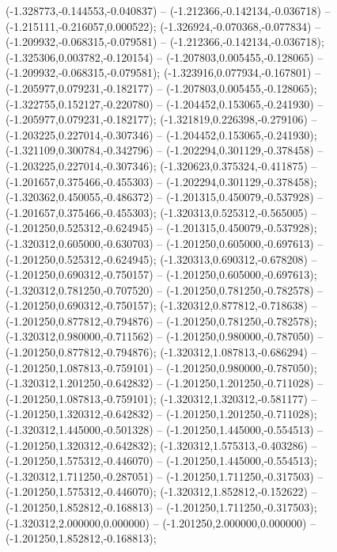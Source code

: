  (-1.328773,-0.144553,-0.040837) -- (-1.212366,-0.142134,-0.036718) -- (-1.215111,-0.216057,0.000522);
 (-1.326924,-0.070368,-0.077834) -- (-1.209932,-0.068315,-0.079581) -- (-1.212366,-0.142134,-0.036718);
 (-1.325306,0.003782,-0.120154) -- (-1.207803,0.005455,-0.128065) -- (-1.209932,-0.068315,-0.079581);
 (-1.323916,0.077934,-0.167801) -- (-1.205977,0.079231,-0.182177) -- (-1.207803,0.005455,-0.128065);
 (-1.322755,0.152127,-0.220780) -- (-1.204452,0.153065,-0.241930) -- (-1.205977,0.079231,-0.182177);
 (-1.321819,0.226398,-0.279106) -- (-1.203225,0.227014,-0.307346) -- (-1.204452,0.153065,-0.241930);
 (-1.321109,0.300784,-0.342796) -- (-1.202294,0.301129,-0.378458) -- (-1.203225,0.227014,-0.307346);
 (-1.320623,0.375324,-0.411875) -- (-1.201657,0.375466,-0.455303) -- (-1.202294,0.301129,-0.378458);
 (-1.320362,0.450055,-0.486372) -- (-1.201315,0.450079,-0.537928) -- (-1.201657,0.375466,-0.455303);
 (-1.320313,0.525312,-0.565005) -- (-1.201250,0.525312,-0.624945) -- (-1.201315,0.450079,-0.537928);
 (-1.320312,0.605000,-0.630703) -- (-1.201250,0.605000,-0.697613) -- (-1.201250,0.525312,-0.624945);
 (-1.320313,0.690312,-0.678208) -- (-1.201250,0.690312,-0.750157) -- (-1.201250,0.605000,-0.697613);
 (-1.320312,0.781250,-0.707520) -- (-1.201250,0.781250,-0.782578) -- (-1.201250,0.690312,-0.750157);
 (-1.320312,0.877812,-0.718638) -- (-1.201250,0.877812,-0.794876) -- (-1.201250,0.781250,-0.782578);
 (-1.320312,0.980000,-0.711562) -- (-1.201250,0.980000,-0.787050) -- (-1.201250,0.877812,-0.794876);
 (-1.320312,1.087813,-0.686294) -- (-1.201250,1.087813,-0.759101) -- (-1.201250,0.980000,-0.787050);
 (-1.320312,1.201250,-0.642832) -- (-1.201250,1.201250,-0.711028) -- (-1.201250,1.087813,-0.759101);
 (-1.320312,1.320312,-0.581177) -- (-1.201250,1.320312,-0.642832) -- (-1.201250,1.201250,-0.711028);
 (-1.320312,1.445000,-0.501328) -- (-1.201250,1.445000,-0.554513) -- (-1.201250,1.320312,-0.642832);
 (-1.320312,1.575313,-0.403286) -- (-1.201250,1.575312,-0.446070) -- (-1.201250,1.445000,-0.554513);
 (-1.320312,1.711250,-0.287051) -- (-1.201250,1.711250,-0.317503) -- (-1.201250,1.575312,-0.446070);
 (-1.320312,1.852812,-0.152622) -- (-1.201250,1.852812,-0.168813) -- (-1.201250,1.711250,-0.317503);
 (-1.320312,2.000000,0.000000) -- (-1.201250,2.000000,0.000000) -- (-1.201250,1.852812,-0.168813);
